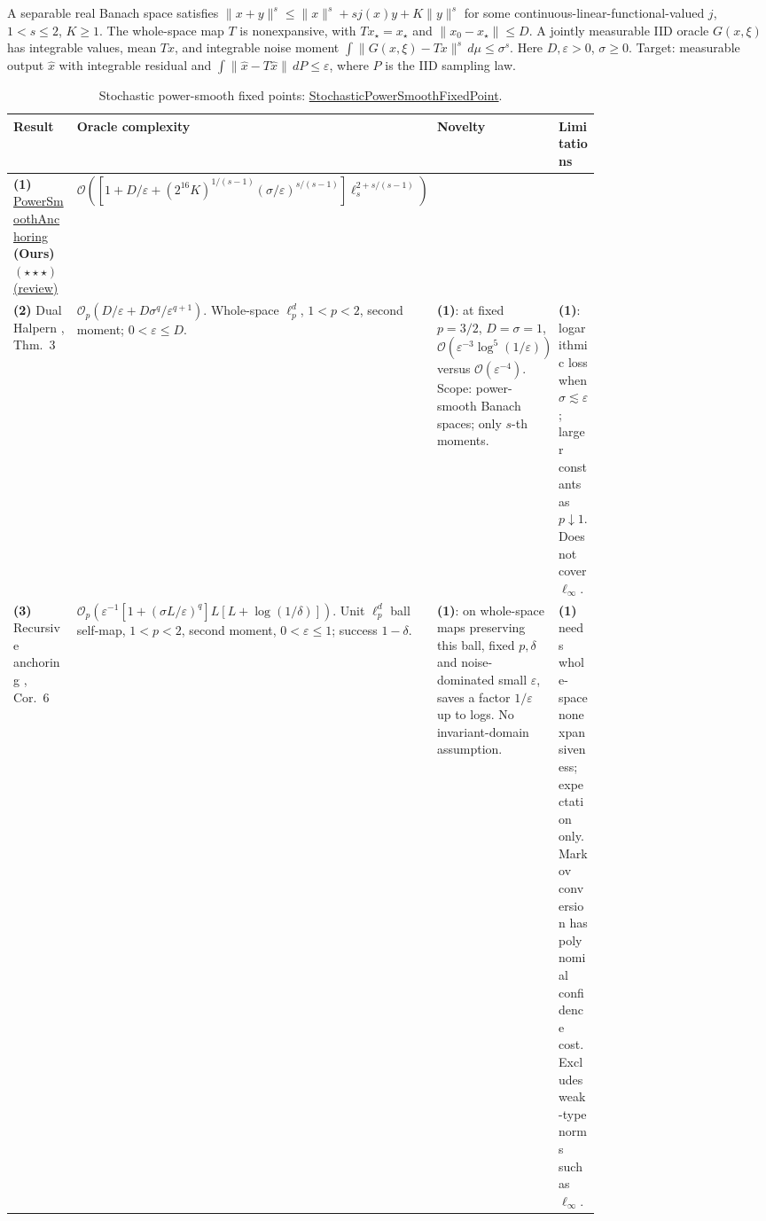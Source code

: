 \begin{table}[tp]
\centering
\caption{Stochastic power-smooth fixed points: \href{https://github.com/k3nfalt/longtails/blob/main/LongTails/Setups/StochasticPowerSmoothFixedPoint.lean}{StochasticPowerSmoothFixedPoint}.}\label{tab:StochasticPowerSmoothFixedPoint}
\parbox{\linewidth}{\footnotesize A separable real Banach space satisfies $\|x+y\|^s\leq\|x\|^s+s j(x)y+K\|y\|^s$ for some continuous-linear-functional-valued $j$, $1<s\leq2$, $K\geq1$. The whole-space map $T$ is nonexpansive, with $Tx_\star=x_\star$ and $\|x_0-x_\star\|\leq D$. A jointly measurable IID oracle $G(x,\xi)$ has integrable values, mean $Tx$, and integrable noise moment $\int\|G(x,\xi)-Tx\|^s\,d\mu\leq\sigma^s$. Here $D,\varepsilon>0$, $\sigma\geq0$. Target: measurable output $\hat x$ with integrable residual and $\int\|\hat x-T\hat x\|\,dP\leq\varepsilon$, where $P$ is the IID sampling law.}\par\smallskip
\begin{threeparttable}
\footnotesize
\setlength{\tabcolsep}{4pt}\renewcommand{\arraystretch}{1.25}
\begin{tabularx}{\linewidth}{@{}>{\raggedright\arraybackslash}p{0.20\linewidth}>{\raggedright\arraybackslash}p{0.32\linewidth}>{\raggedright\arraybackslash}p{0.25\linewidth}>{\raggedright\arraybackslash}X@{}}
\toprule
\textbf{Result} & \textbf{Oracle complexity} & \textbf{Novelty} & \textbf{Limitations} \\
\midrule
\textbf{(1)} \href{https://github.com/k3nfalt/longtails/blob/main/LongTails/Theorems/PowerSmoothAnchoring.lean}{Power\allowbreak Smooth\allowbreak Anchoring} \textbf{(Ours)} $(\star\star\star)$ \href{https://github.com/k3nfalt/longtails/blob/main/scripts/reviews/PowerSmoothAnchoring.md}{(review)} & $\mathcal{O}\!\left(\left[1+D/\varepsilon+(2^{16}K)^{1/(s-1)}(\sigma/\varepsilon)^{s/(s-1)}\right]\ell_s^{2+s/(s-1)}\right)$ & & \\
\midrule[1.2pt]
\textbf{(2)} Dual Halpern \citep{psLee2026v1}, Thm.~3 & $\mathcal{O}_p(D/\varepsilon+D\sigma^q/\varepsilon^{q+1})$. Whole-space $\ell_p^d$, $1<p<2$, second moment; $0<\varepsilon\leq D$. & \textbf{(1)}: at fixed $p=3/2$, $D=\sigma=1$, $\mathcal{O}(\varepsilon^{-3}\log^5(1/\varepsilon))$ versus $\mathcal{O}(\varepsilon^{-4})$. Scope: power-smooth Banach spaces; only $s$-th moments. & \textbf{(1)}: logarithmic loss when $\sigma\lesssim\varepsilon$; larger constants as $p\downarrow1$. Does not cover $\ell_\infty$. \\
\midrule
\textbf{(3)} Recursive anchoring \citep{psDgm2026v1}, Cor.~6 & $\mathcal{O}_p\!\left(\varepsilon^{-1}[1+(\sigma L/\varepsilon)^q]L[L+\log(1/\delta)]\right)$. Unit $\ell_p^d$ ball self-map, $1<p<2$, second moment, $0<\varepsilon\leq1$; success $1-\delta$. & \textbf{(1)}: on whole-space maps preserving this ball, fixed $p,\delta$ and noise-dominated small $\varepsilon$, saves a factor $1/\varepsilon$ up to logs. No invariant-domain assumption. & \textbf{(1)} needs whole-space nonexpansiveness; expectation only. Markov conversion has polynomial confidence cost. Excludes weak-type norms such as $\ell_\infty$. \\

\end{tabularx}
\end{threeparttable}
\end{table}
